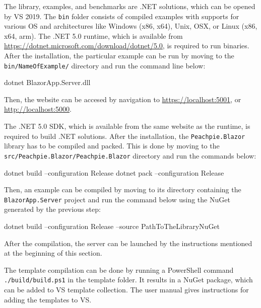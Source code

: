 The library, examples, and benchmarks are .NET solutions, which can be opened by \ac{VS} 2019.
The \texttt{bin} folder consists of compiled examples with supports for various OS and architectures like Windows (x86, x64), Unix, OSX, or Linux (x86, x64, arm).
The .NET 5.0 runtime, which is available from \url{https://dotnet.microsoft.com/download/dotnet/5.0}, is required to run binaries.
After the installation, the particular example can be run by moving to the \texttt{bin/NameOfExa\-mple/} directory and run the command line below:
\par
\begin{code}[frame=none]
dotnet BlazorApp.Server.dll
\end{code}
\par
Then, the website can be accesed by navigation to \url{https://localhost:5001}, or \url{http://localhost:5000}.
\par
The .NET 5.0 SDK, which is available from the same website as the runtime, is required to build .NET solutions.
After the installation, the \texttt{Peachpie.Blazor} library has to be compiled and packed. 
This is done by moving to the \texttt{src/Peach\-pie.Blazor/Peachpie.Blazor} directory and run the commands below:
\par
\begin{code}[frame=none]
dotnet build --configuration Release
dotnet pack --configuration Release
\end{code}
\par
Then, an example can be compiled by moving to its directory containing the \texttt{BlazorApp.Server} project and run the command below using the NuGet generated by the previous step:
\par
\begin{code}[frame=none]
dotnet build --configuration Release --source PathToTheLibraryNuGet
\end{code}
\par
After the compilation, the server can be launched by the instructions mentioned at the beginning of this section.
\par
The template compilation can be done by running a PowerShell command \texttt{./build/build.ps1} in the template folder.
It results in a NuGet package, which can be added to VS template collection.
The user manual gives instructions for adding the templates to VS.